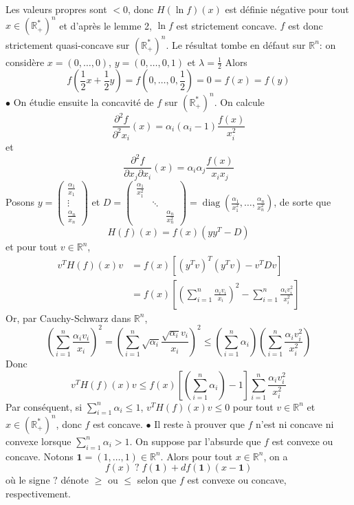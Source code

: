 \documentclass{report}
\DeclareMathOperator{\diag}{diag}
\begin{document}
Les valeurs propres sont $<0$, donc $H(\ln f)(x)$ est définie négative pour tout $x\in(\mathbb R_+^*)^n $ et d'après le lemme 2, $\ln f$ est strictement concave. $f$ est donc strictement quasi-concave sur $(\mathbb R_+^*)^n$.\newline
Le résultat tombe en défaut sur $\mathbb R^n$: on considère $x=(0,\ldots,0)$, $y=(0,\ldots,0,1)$ et $\lambda=\frac{1}{2}$ Alors $$f(\frac{1}{2}x + \frac{1}{2}y) = f(0,\ldots, 0,\frac{1}{2})=0 = f(x) = f(y)$$
$\bullet$ On étudie ensuite la concavité de $f$ sur $(\mathbb R_+^*)^n$.\newline
On calcule $$\frac{\partial^2 f}{\partial^2 x_i}(x) = \alpha_i(\alpha_i-1)\frac{f(x)}{x_i^2}$$
et $$\frac{\partial^2 f}{\partial x_j \partial x_i}(x) = \alpha_i \alpha_j\frac{f(x)}{x_i x_j}$$
Posons $y=\begin{pmatrix}
\frac{\alpha_1}{x_1}\\
\vdots\\
\frac{\alpha_n}{x_n}
\end{pmatrix}$ et $D=\begin{pmatrix}
\frac{\alpha_1}{x_1^2}\\
& \ddots \\
&& \frac{\alpha_n}{x_n^2}
\end{pmatrix}=\diag(\frac{\alpha_1}{x_1^2},\ldots,\frac{\alpha_n}{x_n^2})$, de sorte que 
$$H(f)(x)=f(x)(yy^T-D)$$ et pour tout $v\in \mathbb R^n$,
$$\begin{aligned} v^TH(f)(x)v &= f(x)[(y^Tv)^T(y^Tv)-v^TDv] \\
&= f(x) \left[\left(\sum_{i=1}^n \frac{\alpha_i v_i}{x_i}\right)^2 - \sum_{i=1}^n \frac{\alpha_i v_i^2}{x_i^2} \right]
\end{aligned}$$
Or, par Cauchy-Schwarz dans $\mathbb R^n$, 
$$\left(\sum_{i=1}^n\frac{\alpha_i v_i}{x_i} \right)^2 = \left(\sum_{i=1}^n \sqrt{\alpha_i}\frac{\sqrt{\alpha_i} v_i}{x_i} \right)^2 \leq \left(\sum_{i=1}^n \alpha_i \right) \left(\sum_{i=1}^n\frac{\alpha_i v_i^2}{x_i^2} \right)$$
Donc $$ v^TH(f)(x)v \leq f(x)\left[ \left(\sum_{i=1}^n \alpha_i\right) -1 \right]\sum_{i=1}^n\frac{\alpha_i v_i^2}{x_i^2}$$
Par conséquent, si $\displaystyle \sum_{i=1}^n \alpha_i \leq 1$, $v^TH(f)(x)v \leq 0$ pour tout $v\in \mathbb R^n$ et $x\in(\mathbb R_+^*)^n$, donc $f$ est concave. \newline 
\newline
$\bullet$ Il reste à prouver que $f$ n'est ni concave ni convexe lorsque $\displaystyle \sum_{i=1}^n \alpha_i > 1$. On suppose par l'absurde que $f$ est convexe ou concave. Notons $\mathbf{1}=(1,\ldots,1)\in \mathbb R^n$. Alors pour tout $x\in \mathbb R^n$, on a $$f(x) \;?\; f(\mathbf 1) + df(\mathbf 1)(x- \mathbf 1)$$ où le signe $?$ dénote $\geq$ ou $\leq$ selon que $f$ est convexe ou concave, respectivement.
\end{document}

